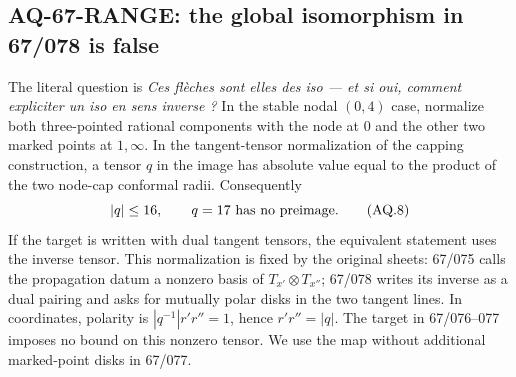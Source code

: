 \documentclass[11pt,a4paper]{article}
\theoremstyle{definition}\newtheorem{definition}[theorem]{Definition}
\theoremstyle{remark}\newtheorem{remark}[theorem]{Remark}
\begin{document}
\subsection{AQ-67-RANGE: the global isomorphism in 67/078 is false}
The literal question is \emph{Ces fl\`eches sont elles
des iso --- et si oui, comment expliciter un iso en
sens inverse ?} In the stable nodal $(0,4)$ case,
normalize both three-pointed rational components with
the node at $0$ and the other two marked points at
$1,\infty$. In the tangent-tensor normalization of
the capping construction, a tensor $q$ in the image
has absolute value equal to the product of the two
node-cap conformal radii. Consequently
\[
 |q|\leq16,\qquad q=17\ \hbox{has no preimage}.                  \tag{AQ.8}
\]
If the target is written with dual tangent tensors,
the equivalent statement uses the inverse tensor.
This normalization is fixed by the original sheets:
67/075 calls the propagation datum a nonzero basis of
$T_{x'}\otimes T_{x''}$; 67/078 writes its inverse
as a dual pairing and asks for mutually polar disks
in the two tangent lines. In coordinates, polarity
is $|q^{-1}|r'r''=1$, hence $r'r''=|q|$.
The target in 67/076--077 imposes no bound on this
nonzero tensor. We use the map without additional
marked-point disks in 67/077.
\end{document}
